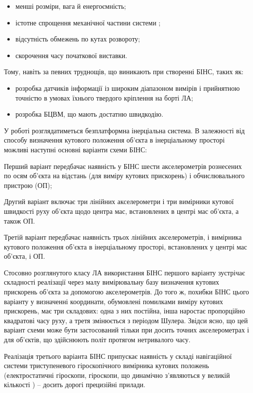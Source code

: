 \begin{itemize}
 \item менші розміри, вага й енергоємність;
 \item істотне спрощення механічної частини системи ; 
 \item відсутність обмежень по кутах розвороту;
 \item скорочення часу початкової виставки.
\end{itemize}

Тому, навіть за певних труднощів, що виникають при створенні БІНС, таких як:
\begin{itemize}
 \item розробка датчиків інформації із широким діапазоном вимірів і прийнятною точністю в умовах їхнього твердого кріплення на борті ЛА;
 \item розробка БЦВМ, що мають достатню швидкодію.
\end{itemize}

У роботі розглядатиметься безплатформна інерціальна система.
В залежності від способу визначення кутового положення об'єкта в інерціальному просторі 
можливі наступні основні варіанти схеми БІНС:

Перший варіант передбачає наявність у БІНС шести акселерометрів  рознесених по осям об'єкта на відстань 
(для виміру кутових прискорень) і обчислювального пристрою (ОП);

Другий варіант включає три лінійних акселерометри  і три вимірники кутової 
швидкості руху об'єкта щодо центра мас, встановлених в центрі мас об'єкта, а також ОП.

Третій варіант передбачає наявність трьох лінійних акселерометрів, і вимірника 
кутового положення об'єкта в інерціальному просторі, встановлених у центрі мас об'єкта, і ОП.

Стосовно розглянутого класу ЛА використання БІНС першого варіанту зустрічає складності 
реалізації через малу вимірювальну базу  визначення кутових прискорень об'єкта за 
допомогою акселерометрів. До того ж, похибки БІНС цього варіанту у визначенні координати, 
обумовлені помилками виміру кутових прискорень, має три складових: одна з них постійна, 
інша наростає пропорційно квадратові часу руху, а третя змінюється з періодом Шулера. 
Звідси ясно, що цей варіант схеми може бути застосований тільки при досить точних 
акселерометрах і для об'єктів, що здійснюють політ протягом нетривалого часу.
 
Реалізація третього варіанта БІНС припускає наявність у складі навігаційної 
системи триступеневого гіроскопічного вимірника кутових положень (електростатичні 
гіроскопи, гіроскопи, що динамічно з’являються у великій кількості ) -- 
досить дорогі  прецизійні прилади. 

